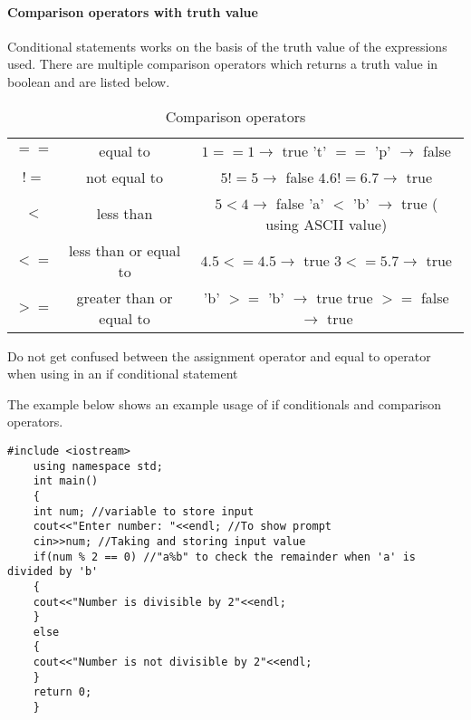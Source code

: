 \documentclass[11pt,fleqn]{book} %
\begin{document}
\paragraph{Comparison operators with truth value}
Conditional statements works on the basis of the truth value of the expressions used.
There are multiple comparison operators which returns a truth value in boolean and are listed below. \\
\begin{table}[ht]
	\centering
	\begin{tabular}{|c|c|c|}
		\hline
		\thead{Operator} & \thead{Description} & \thead{Usage Example}\\
		\hline
		$==$ & equal to & \makecell{$1==1 \rightarrow$ true\\ 't' $==$ 'p' $\rightarrow$ false} \\
		\hline
		$!=$ & not equal to & \makecell{$5 != 5 \rightarrow$ false \\ $4.6 != 6.7 \rightarrow$ true }\\
		\hline
		$<$ & less than & \makecell{$5<4 \rightarrow$ false \\ 'a' $<$ 'b' $\rightarrow$ true ( using ASCII value)}\\
		\hline
		$<=$ & less than or equal to & \makecell{$4.5 <= 4.5 \rightarrow$ true \\ $3 <= 5.7 \rightarrow$ true }\\
		\hline
		$>=$& greater than or equal to & \makecell{'b' $>=$ 'b' $\rightarrow$ true \\ 
			true $>=$ false $\rightarrow$ true} \\
		\hline
		
	\end{tabular}
	\caption{Comparison operators}
	\label{tab:ComparisonOperators}
	
\end{table}
\begin{remark}
	Do not get confused between the assignment operator and equal to operator when using in an if conditional statement
\end{remark}
\newpage
The example below shows an example usage of if conditionals and comparison operators.
\begin{example}
	
	\begin{lstlisting}[title={Using if condition to check if number is divisible by 2},captionpos=b]
	#include <iostream>
	using namespace std;
	int main()
	{
	int num; //variable to store input
	cout<<"Enter number: "<<endl; //To show prompt
	cin>>num; //Taking and storing input value
	if(num % 2 == 0) //"a%b" to check the remainder when 'a' is  divided by 'b'
	{
	cout<<"Number is divisible by 2"<<endl;
	}
	else
	{
	cout<<"Number is not divisible by 2"<<endl;
	}
	return 0;
	}
	\end{lstlisting}
\end{example}
\end{document}
